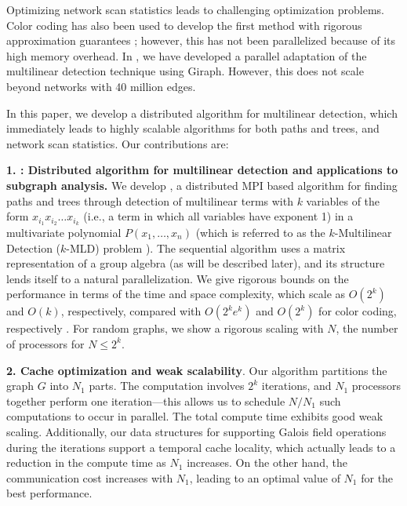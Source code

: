 Optimizing network scan statistics leads to challenging optimization problems.
Color coding has also been used to develop the first method with rigorous approximation
guarantees \cite{cadena:sdm17}; however, this has not been parallelized because of
its high memory overhead. In \cite{cadena:bigdata17}, we have developed a
parallel adaptation of the multilinear detection technique using Giraph. However,
this does not scale beyond networks with 40 million edges.

In this paper, we develop a distributed algorithm for multilinear detection,
which immediately leads to highly scalable algorithms for both paths and trees,
and network scan statistics.
Our contributions are:


\noindent
\textbf{1. \ouralgo{}: Distributed algorithm for multilinear detection
and applications to subgraph analysis.}
We develop \ouralgo{}, a distributed MPI based algorithm for finding
paths and trees through detection of
multilinear terms with $k$ variables of the form $x_{i_1}x_{i_2}\ldots x_{i_k}$ (i.e., a term in
which all variables have exponent 1) in a multivariate polynomial
$P(x_1,\ldots,x_n)$ (which is referred to as the $k$-Multilinear Detection (\textsc{$k$-MLD}) problem
\cite{koutis:icalp08, williams2009finding}). The sequential algorithm uses a matrix representation
of a group algebra (as will be described later), and its structure lends itself to a natural
parallelization.  We give rigorous bounds on the performance in terms of the time and
space complexity, which scale as
$O(2^k)$ and $O(k)$, respectively, compared with $O(2^ke^k)$ and $O(2^k)$ for
color coding, respectively \cite{zhao2012sahad, slota:icpp13, slota:ipdps14}.
For random graphs, we show a rigorous scaling with $N$, the number of processors for $N\leq 2^k$.

\noindent
\textbf{2. Cache optimization and weak scalability}. %
Our algorithm partitions the graph $G$ into $N_1$ parts. The computation involves $2^k$
iterations, and $N_1$ processors together perform one iteration---this allows us to schedule
$N/N_1$ such computations to occur in parallel. The total compute time exhibits good weak scaling.
Additionally, our data structures for supporting Galois field operations
during the iterations support a temporal cache locality, which actually leads to a reduction
in the compute time as $N_1$ increases. On the other hand, the communication cost increases
with $N_1$, leading to an optimal value of $N_1$ for the best performance.




